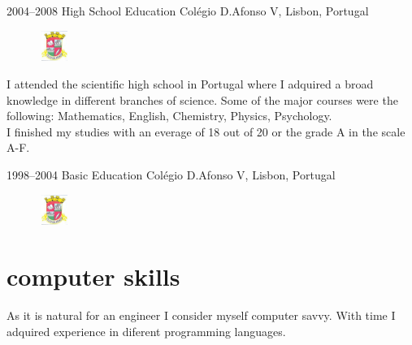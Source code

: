 \documentclass[]{friggeri-cv} %
\begin{document}
\begin{entrylist2}
\entrynew
{2004--2008}
{High School Education}
{Colégio D.Afonso V, Lisbon, Portugal}
{
\begin{figure}
	\vspace{-20pt}
	\begin{center}
		\includegraphics[width=1cm,height=1cm]{cav}
	\end{center}
\end{figure}
I attended the scientific high school in Portugal where I adquired a broad knowledge in different branches of science. Some of the major courses were the following: Mathematics, English, Chemistry, Physics, Psychology.
\\
I finished my studies with an everage of 18 out of 20 or the grade A in the scale A-F.
}
\end{entrylist2}
\begin{entrylist2}
\entrynew
{1998--2004}
{Basic Education }
{Colégio D.Afonso V, Lisbon, Portugal}
{
\begin{figure}
	\vspace{-20pt}
	\begin{center}
		\includegraphics[width=1cm,height=1cm]{cav}
	\end{center}
\end{figure}
}
\end{entrylist2}




\section{computer skills}
As it is natural for an engineer I consider myself computer savvy. With time I adquired experience in diferent programming languages.
\end{document}
